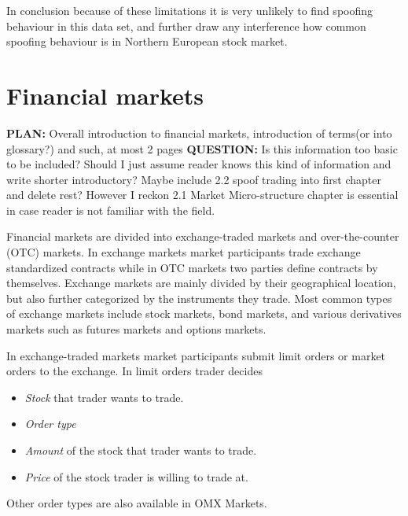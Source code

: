 \documentclass{tut-thesis}
\begin{document}
In conclusion because of these limitations it is very unlikely to find spoofing behaviour in this data set, and further draw any interference how common spoofing behaviour is in Northern European stock market.  


\chapter{Financial markets}
\textbf{PLAN:} Overall introduction to financial markets, introduction of terms(or into glossary?) and such, at most 2 pages
\textbf{QUESTION:} Is this information too basic to be included? Should I just assume reader knows this kind of information and write shorter introductory? Maybe include 2.2 spoof trading into first chapter and delete rest? However I reckon 2.1 Market Micro-structure chapter is essential in case reader is not familiar with the field.
 

Financial markets are divided into exchange-traded markets and over-the-counter (OTC) markets. In exchange markets market participants trade exchange standardized contracts while in OTC markets two parties define contracts by themselves. \autocite{Hull2017} Exchange markets are mainly divided by their geographical location, but also further categorized by the instruments they trade. Most common types of exchange markets include stock markets, bond markets, and various derivatives markets such as futures markets and options markets.

In exchange-traded markets market participants submit limit orders or market orders to the exchange. In limit orders trader decides 

\begin{itemize}
	\item \textit{Stock} that trader wants to trade.
	\item \textit{Order type} 
	\item \textit{Amount} of the stock that trader wants to trade.
	\item \textit{Price} of the stock trader is willing to trade at.
\end{itemize}

Other order types are also available in OMX Markets. 
\end{document}
